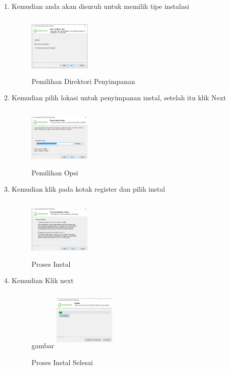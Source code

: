 \begin{enumerate}
    \item Kemudian anda akan disuruh untuk memilih tipe instalasi
    \begin{figure}[!htbp]
        \centering
        \includegraphics[width=3cm,height=3cm]{figures/gambar4.png}
        \caption{Pemilihan Direktori Penyimpanan}
        \label{Directory}
        \end{figure}

    \item Kemudian pilih lokasi untuk penyimpanan instal, setelah itu klik Next
    \begin{figure}[!htbp]
        \centering
        \includegraphics[width=3cm,height=3cm]{figures/gambar5.png}
        \caption{Pemilihan Opsi}
        \label{opsi}
        \end{figure}

    \item Kemudian klik pada kotak register dan pilih instal
    \begin{figure}[!htbp]
        \centering
        \includegraphics[width=3cm,height=3cm]{figures/gambar6.png}
        \caption{Proses Instal}
        \label{Proses}
        \end{figure}

    \item Kemudian Klik next
    \begin{figure}[!htbp]gambar
        \centering
        \includegraphics[width=3cm,height=3cm]{figures/gambar7.png}
        \caption{Proses Instal Selesai}
        \label{Proses}
        \end{figure}


\end{enumerate}
